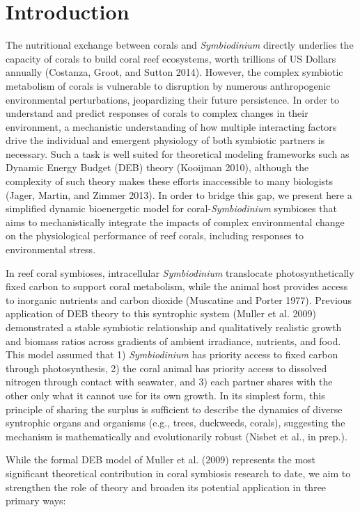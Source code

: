 \documentclass[]{elsarticle} %
\begin{document}
\section{Introduction}\label{introduction}

The nutritional exchange between corals and \emph{Symbiodinium} directly
underlies the capacity of corals to build coral reef ecosystems, worth
trillions of US Dollars annually (Costanza, Groot, and Sutton 2014).
However, the complex symbiotic metabolism of corals is vulnerable to
disruption by numerous anthropogenic environmental perturbations,
jeopardizing their future persistence. In order to understand and
predict responses of corals to complex changes in their environment, a
mechanistic understanding of how multiple interacting factors drive the
individual and emergent physiology of both symbiotic partners is
necessary. Such a task is well suited for theoretical modeling
frameworks such as Dynamic Energy Budget (DEB) theory (Kooijman 2010),
although the complexity of such theory makes these efforts inaccessible
to many biologists (Jager, Martin, and Zimmer 2013). In order to bridge
this gap, we present here a simplified dynamic bioenergetic model for
coral-\emph{Symbiodinium} symbioses that aims to mechanistically
integrate the impacts of complex environmental change on the
physiological performance of reef corals, including responses to
environmental stress.

In reef coral symbioses, intracellular \emph{Symbiodinium} translocate
photosynthetically fixed carbon to support coral metabolism, while the
animal host provides access to inorganic nutrients and carbon dioxide
(Muscatine and Porter 1977). Previous application of DEB theory to this
syntrophic system (Muller et al. 2009) demonstrated a stable symbiotic
relationship and qualitatively realistic growth and biomass ratios
across gradients of ambient irradiance, nutrients, and food. This model
assumed that 1) \emph{Symbiodinium} has priority access to fixed carbon
through photosynthesis, 2) the coral animal has priority access to
dissolved nitrogen through contact with seawater, and 3) each partner
shares with the other only what it cannot use for its own growth. In its
simplest form, this principle of sharing the surplus is sufficient to
describe the dynamics of diverse syntrophic organs and organisms (e.g.,
trees, duckweeds, corals), suggesting the mechanism is mathematically
and evolutionarily robust (Nisbet et al., in prep.).

While the formal DEB model of Muller et al. (2009) represents the most
significant theoretical contribution in coral symbiosis research to
date, we aim to strengthen the role of theory and broaden its potential
application in three primary ways:
\end{document}
